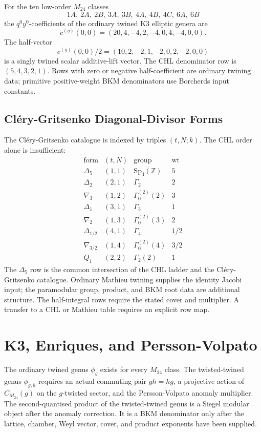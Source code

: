 \documentclass[11pt]{article}
\providecommand{\ZZ}{\mathbb{Z}}
\providecommand{\Sp}{\mathrm{Sp}}
\providecommand{\wt}{\operatorname{wt}}
\providecommand{\Delf}{\Delta_5}
\begin{document}
For the ten low-order \(M_{24}\) classes
\[
1A,\ 2A,\ 2B,\ 3A,\ 3B,\ 4A,\ 4B,\ 4C,\ 6A,\ 6B
\]
the \(q^0y^0\)-coefficients of the ordinary twined K3 elliptic genera
are
\[
  c^{(g)}(0,0)=(20,4,-4,2,-4,0,4,-4,0,0).
\]
The half-vector
\[
  c^{(g)}(0,0)/2=(10,2,-2,1,-2,0,2,-2,0,0)
\]
is a singly twined scalar additive-lift vector.  The CHL denominator
row is \((5,4,3,2,1)\).  Rows with zero or negative half-coefficient
are ordinary twining data; primitive positive-weight BKM denominators
use Borcherds input constants.

\subsection{Cl\'ery-Gritsenko Diagonal-Divisor Forms}

The Cl\'ery-Gritsenko catalogue is indexed by triples \((t,N;k)\).  The
CHL order alone is insufficient:
\[
\begin{array}{c|c|c|c}
\text{form} & (t,N) & \text{group} & \wt\\
\hline
\Delf & (1,1) & \Sp_4(\ZZ) & 5\\
\Delta_2 & (2,1) & \Gamma_2 & 2\\
\nabla_3 & (1,2) & \Gamma_0^{(2)}(2) & 3\\
\Delta_1 & (3,1) & \Gamma_3 & 1\\
\nabla_2 & (1,3) & \Gamma_0^{(2)}(3) & 2\\
\Delta_{1/2} & (4,1) & \Gamma_4 & 1/2\\
\nabla_{3/2} & (1,4) & \Gamma_0^{(2)}(4) & 3/2\\
Q_1 & (2,2) & \Gamma_2(2) & 1
\end{array}
\]
The \(\Delf\) row is the common intersection of the CHL ladder and the
Cl\'ery-Gritsenko catalogue.  Ordinary Mathieu twining supplies the
identity Jacobi input; the paramodular group, product, and BKM root data
are additional structure.  The half-integral rows require the stated
cover and multiplier.  A transfer to a CHL or Mathieu table requires an
explicit row map.

\section{K3, Enriques, and Persson-Volpato}

The ordinary twined genus \(\phi_g\) exists for every \(M_{24}\) class.
The twisted-twined genus \(\phi_{g,h}\) requires an actual commuting
pair \(gh=hg\), a projective action of \(C_{M_{24}}(g)\) on the
\(g\)-twisted sector, and the Persson-Volpato anomaly multiplier.  The
second-quantised product of the twisted-twined genus is a Siegel
modular object after the anomaly correction.  It is a BKM denominator
only after the lattice, chamber, Weyl vector, cover, and product
exponents have been supplied.
\end{document}

